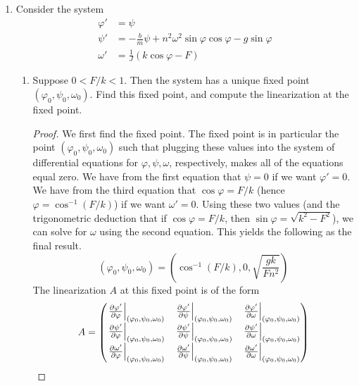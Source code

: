 \documentclass[../psets.tex]{subfiles}
\begin{document}
\begin{enumerate}
\begin{proof}
    \end{proof}
    \item Consider the system
    \begin{align*}
        \varphi' &= \psi\\
        \psi' &= -\frac{b}{m}\psi+n^2\omega^2\sin\varphi\cos\varphi-g\sin\varphi\\
        \omega' &= \frac{1}{J}(k\cos\varphi-F)
    \end{align*}
    \begin{enumerate}
        \item Suppose $0<F/k<1$. Then the system has a unique fixed point $(\varphi_0,\psi_0,\omega_0)$. Find this fixed point, and compute the linearization at the fixed point.
        \begin{proof}
            We first find the fixed point. The fixed point is in particular the point $(\varphi_0,\psi_0,\omega_0)$ such that plugging these values into the system of differential equations for $\varphi,\psi,\omega$, respectively, makes all of the equations equal zero. We have from the first equation that $\psi=0$ if we want $\varphi'=0$. We have from the third equation that $\cos\varphi=F/k$ (hence $\varphi=\cos^{-1}(F/k)$) if we want $\omega'=0$. Using these two values (and the trigonometric deduction that if $\cos\varphi=F/k$, then $\sin\varphi=\sqrt{k^2-F^2}$), we can solve for $\omega$ using the second equation. This yields the following as the final result.
            \begin{equation*}
                \boxed{(\varphi_0,\psi_0,\omega_0) = \left( \cos^{-1}(F/k),0,\sqrt{\frac{gk}{Fn^2}} \right)}
            \end{equation*}
            The linearization $A$ at this fixed point is of the form
            \begin{equation*}
                A =
                \begin{pmatrix}
                    \eval{\pdv{\varphi'}{\varphi}}_{(\varphi_0,\psi_0,\omega_0)} & \eval{\pdv{\varphi'}{\psi}}_{(\varphi_0,\psi_0,\omega_0)} & \eval{\pdv{\varphi'}{\omega}}_{(\varphi_0,\psi_0,\omega_0)}\\
                    \eval{\pdv{\psi'}{\varphi}}_{(\varphi_0,\psi_0,\omega_0)} & \eval{\pdv{\psi'}{\psi}}_{(\varphi_0,\psi_0,\omega_0)} & \eval{\pdv{\psi'}{\omega}}_{(\varphi_0,\psi_0,\omega_0)}\\
                    \eval{\pdv{\omega'}{\varphi}}_{(\varphi_0,\psi_0,\omega_0)} & \eval{\pdv{\omega'}{\psi}}_{(\varphi_0,\psi_0,\omega_0)} & \eval{\pdv{\omega'}{\omega}}_{(\varphi_0,\psi_0,\omega_0)}\\

\end{pmatrix}
\end{equation*}
\end{proof}
\end{enumerate}
\end{enumerate}
\end{document}
